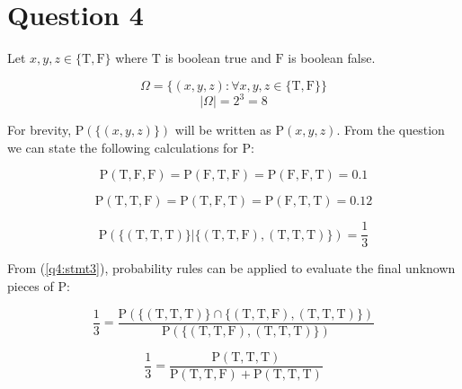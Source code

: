 \section{Question 4}

\newcommand{\implies}{\Longrightarrow}

Let \(x, y, z \in \{ \mathrm{T}, \mathrm{F} \}\) where \( \mathrm{T} \) is boolean true and \( \mathrm{F} \) is boolean false.

\begin{equation}
	\Omega = \{ (x, y, z): \forall x, y, z \in \{ \mathrm{T}, \mathrm{F} \} \}
\end{equation}
\begin{equation}
	| \Omega | = 2 ^ 3 = 8
\end{equation}

For brevity, $\mathrm{P} (\{(x, y, z)\})$ will be written as $\mathrm{P} (x, y, z)$.
From the question we can state the following calculations for $\mathrm{P}$:

\begin{equation} \label{q4:stmt1}
	\mathrm{P} (\mathrm{T}, \mathrm{F}, \mathrm{F}) = \mathrm{P} (\mathrm{F}, \mathrm{T}, \mathrm{F}) = \mathrm{P} (\mathrm{F}, \mathrm{F}, \mathrm{T}) = 0.1
\end{equation}

\begin{equation} \label{q4:stmt2}
\mathrm{P} (\mathrm{T}, \mathrm{T}, \mathrm{F}) = \mathrm{P} (\mathrm{T}, \mathrm{F}, \mathrm{T}) = \mathrm{P} (\mathrm{F}, \mathrm{T}, \mathrm{T}) = 0.12
\end{equation}

\begin{equation} \label{q4:stmt3}
\mathrm{P} ( \{ (\mathrm{T}, \mathrm{T}, \mathrm{T}) \} | \{ (\mathrm{T}, \mathrm{T}, \mathrm{F}), (\mathrm{T}, \mathrm{T}, \mathrm{T}) \}) = \frac{1}{3}
\end{equation}

From (\ref{q4:stmt3}), probability rules can be applied to evaluate the final unknown pieces of $\mathrm{P}$:

\[
\frac{1}{3} = \frac{\mathrm{P} ( \{ (\mathrm{T}, \mathrm{T}, \mathrm{T}) \} \cap \{ (\mathrm{T}, \mathrm{T}, \mathrm{F}), (\mathrm{T}, \mathrm{T}, \mathrm{T}) \} )}{\mathrm{P}( \{ (\mathrm{T}, \mathrm{T}, \mathrm{F}), (\mathrm{T}, \mathrm{T}, \mathrm{T}) \})}
\]

\[
\frac{1}{3} = \frac{\mathrm{P} (\mathrm{T}, \mathrm{T}, \mathrm{T})}{\mathrm{P}( \mathrm{T}, \mathrm{T}, \mathrm{F}) + \mathrm{P} (\mathrm{T}, \mathrm{T}, \mathrm{T})}
\]

